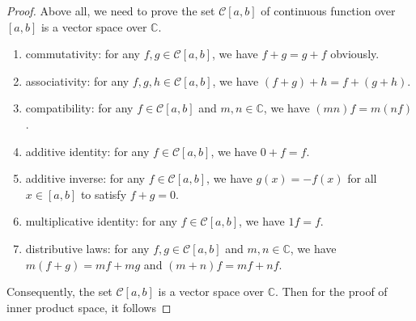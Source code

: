\documentclass[a4paper]{article}
\begin{document}
\begin{proof}
Above all, we need to prove the set $\mathcal{C}[a, b]$ of continuous function over $[a, b]$ is a vector space over $\mathbb{C}$.

\begin{enumerate}
    \item commutativity: for any $f, g \in \mathcal{C}[a, b]$, we have $f + g = g + f$ obviously.
    \item associativity: for any $f, g, h \in \mathcal{C}[a, b]$, we have $(f + g) + h = f + (g + h)$.
    \item compatibility: for any $f \in \mathcal{C}[a, b]$ and $m, n \in \mathbb{C}$, we have $(mn)f = m(nf)$.
    \item additive identity: for any $f \in \mathcal{C}[a, b]$, we have $0 + f = f$.
    \item additive inverse: for any $f \in \mathcal{C}[a, b]$, we have $g(x) = -f(x)$ for all $x \in [a, b]$ to satisfy $f + g = 0$.
    \item multiplicative identity: for any $f \in \mathcal{C}[a, b]$, we have $1f = f$.
    \item distributive laws: for any $f, g \in \mathcal{C}[a, b]$ and $m, n \in \mathbb{C}$, we have $m(f + g) = mf + mg$ and $(m + n)f = mf + nf$.
\end{enumerate}

Consequently, the set $\mathcal{C}[a, b]$ is a vector space over $\mathbb{C}$.
Then for the proof of inner product space, it follows


\end{proof}
\end{document}
